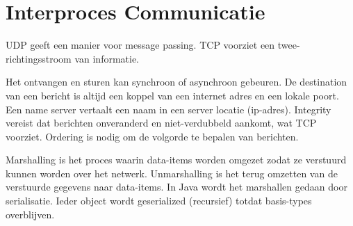 \documentclass[../samenvatting.tex]{subfiles}
\begin{document}
\chapter{Interproces Communicatie}

UDP geeft een manier voor message passing. TCP voorziet een twee-richtingsstroom van informatie. 

Het ontvangen en sturen kan synchroon of asynchroon gebeuren. De destination van een bericht is altijd een koppel van een internet adres en een lokale poort. Een name server vertaalt een naam in een server locatie (ip-adres). Integrity vereist dat berichten onveranderd en niet-verdubbeld aankomt, wat TCP voorziet. Ordering is nodig om de volgorde te bepalen van berichten.

Marshalling is het proces waarin data-items worden omgezet zodat ze verstuurd kunnen worden over het netwerk. Unmarshalling is het terug omzetten van de verstuurde gegevens naar data-items. In Java wordt het marshallen gedaan door serialisatie. Ieder object wordt geserialized (recursief) totdat basis-types overblijven.
\end{document}
